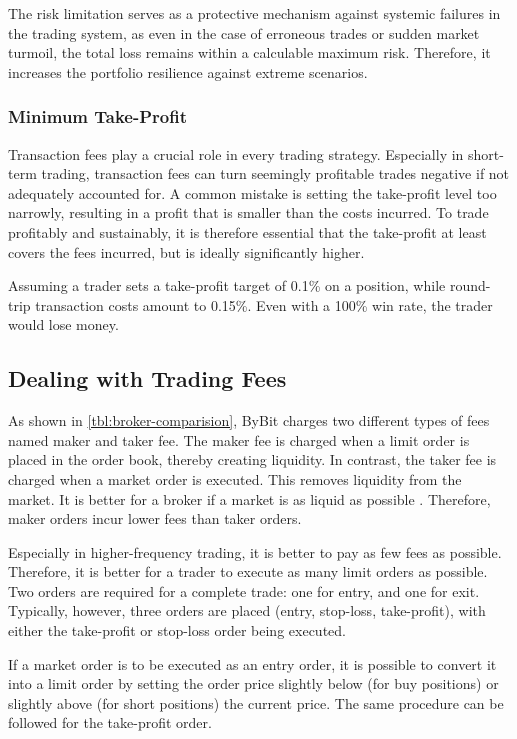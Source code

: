 The risk limitation serves as a protective mechanism against systemic failures in the trading system, as even in the case of erroneous trades or sudden market turmoil, the total loss remains within a calculable maximum risk.
Therefore, it increases the portfolio resilience against extreme scenarios.

\subsubsection{Minimum Take-Profit}

Transaction fees play a crucial role in every trading strategy.
Especially in short-term trading, transaction fees can turn seemingly profitable trades negative if not adequately accounted for.
A common mistake is setting the take-profit level too narrowly, resulting in a profit that is smaller than the costs incurred.
To trade profitably and sustainably, it is therefore essential that the take-profit at least covers the fees incurred, but is ideally significantly higher.

Assuming a trader sets a take-profit target of 0.1\% on a position, while round-trip transaction costs amount to 0.15\%.
Even with a 100\% win rate, the trader would lose money.

\subsection{Dealing with Trading Fees}
\label{chap:dealing-with-trading-fees}

As shown in \autoref{tbl:broker-comparision}, ByBit charges two different types of fees named maker and taker fee.
The maker fee is charged when a limit order is placed in the order book, thereby creating liquidity.
In contrast, the taker fee is charged when a market order is executed.
This removes liquidity from the market.
It is better for a broker if a market is as liquid as possible \cite{liquid-markets}.
Therefore, maker orders incur lower fees than taker orders.

Especially in higher-frequency trading, it is better to pay as few fees as possible.
Therefore, it is better for a trader to execute as many limit orders as possible.
Two orders are required for a complete trade: one for entry, and one for exit.
Typically, however, three orders are placed (entry, stop-loss, take-profit), with either the take-profit or stop-loss order being executed.

If a market order is to be executed as an entry order, it is possible to convert it into a limit order by setting the order price slightly below (for buy positions) or slightly above (for short positions) the current price.
The same procedure can be followed for the take-profit order.

